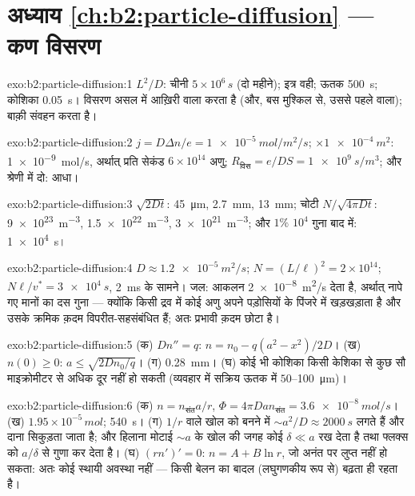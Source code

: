 \section*{अध्याय \ref{ch:b2:particle-diffusion} --- कण विसरण}

\begin{solution}{exo:b2:particle-diffusion:1}
$L^2/D$: चीनी $5 \times 10^6\,\unit{s}$ (दो महीने); इत्र वही;
ऊतक \qty{500}{s}; कोशिका \qty{0.05}{s}। विसरण असल में आख़िरी वाला
करता है (और, बस मुश्किल से, उससे पहले वाला); बाक़ी संवहन करता है।
\end{solution}

\begin{solution}{exo:b2:particle-diffusion:2}
$j = D\Delta n/e = \qty{1e-5}{mol/m^2/s}$; $\times \qty{1e-4}{m^2}$:
\qty{1e-9}{mol/s}, अर्थात् प्रति सेकंड $6 \times 10^{14}$ अणु;
$R_{\text{विस}} = e/DS = \qty{1e9}{s/m^3}$; और श्रेणी में दो: आधा।
\end{solution}

\begin{solution}{exo:b2:particle-diffusion:3}
$\sqrt{2Dt}$: \qty{45}{\micro m}, \qty{2.7}{mm}, \qty{13}{mm}; चोटी $N/\sqrt{4\pi
Dt}$: \qty{9e23}{m^{-3}}, \qty{1.5e22}{m^{-3}}, \qty{3e21}{m^{-3}}; और $1\%$
$10^4$ गुना बाद में: \qty{1e4}{s}।
\end{solution}

\begin{solution}{exo:b2:particle-diffusion:4}
$D \approx \qty{1.2e-5}{m^2/s}$; $N = (L/\ell)^2 = 2 \times 10^{14}$; $N\ell/v^*
= \qty{3e4}{s}$, \qty{2}{ms} के सामने। जल: आकलन
\qty{2e-8}{m^2/s} देता है, अर्थात् नापे गए मानों का दस गुना --- क्योंकि किसी द्रव में कोई
अणु अपने पड़ोसियों के पिंजरे में खड़खड़ाता है और उसके क्रमिक क़दम
विपरीत-सहसंबंधित हैं; अतः प्रभावी क़दम छोटा है।
\end{solution}

\begin{solution}{exo:b2:particle-diffusion:5}
(क) $Dn'' = q$: $n = n_0 - q(a^2 - x^2)/2D$। (ख) $n(0) \ge 0$: $a \le
\sqrt{2Dn_0/q}$। (ग) \qty{0.28}{mm}। (घ) कोई भी कोशिका किसी केशिका से
कुछ सौ माइक्रोमीटर से अधिक दूर नहीं हो सकती (व्यवहार में सक्रिय ऊतक में
$50$--\qty{100}{\micro m})।
\end{solution}

\begin{solution}{exo:b2:particle-diffusion:6}
(क) $n = n_{\text{संत}}a/r$, $\Phi = 4\pi D a n_{\text{संत}} = \qty{3.6e-8}{mol/s}$।
(ख) $1.95 \times 10^{-5}\,\unit{mol}$; \qty{540}{s}। (ग) $1/r$ वाले खोल को
बनने में $\sim a^2/D \approx \qty{2000}{s}$ लगते हैं और दाना सिकुड़ता जाता है; और हिलाना
मोटाई $\sim a$ के खोल की जगह कोई  $\delta \ll a$ रख देता है
तथा फ्लक्स को $a/\delta$ से गुणा कर देता है। (घ) $(rn')' = 0$: $n = A + B\ln r$,
जो अनंत पर लुप्त नहीं हो सकता: अतः कोई स्थायी अवस्था नहीं --- किसी बेलन का
बादल (लघुगणकीय रूप से) बढ़ता ही रहता है।
\end{solution}

